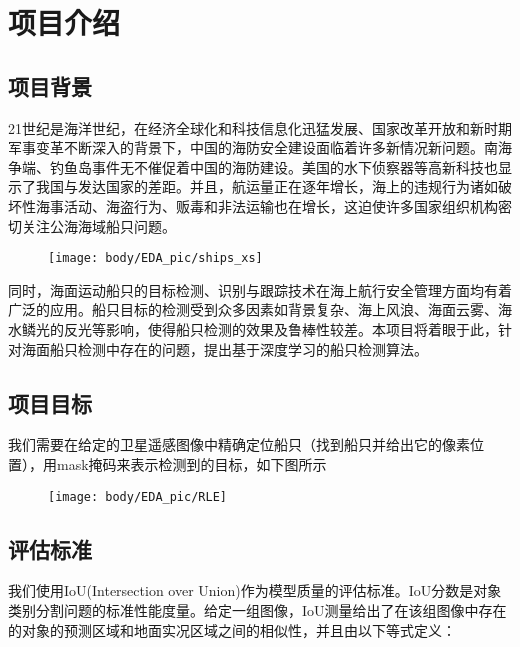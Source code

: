 
\chapter{项目介绍}\label{ux9879ux76eeux4ecbux7ecd}

\section{项目背景}\label{ux9879ux76eeux80ccux666f}

21世纪是海洋世纪，在经济全球化和科技信息化迅猛发展、国家改革开放和新时期军事变革不断深入的背景下，中国的海防安全建设面临着许多新情况新问题。南海争端、钓鱼岛事件无不催促着中国的海防建设。美国的水下侦察器等高新科技也显示了我国与发达国家的差距。并且，航运量正在逐年增长，海上的违规行为诸如破坏性海事活动、海盗行为、贩毒和非法运输也在增长，这迫使许多国家组织机构密切关注公海海域船只问题。

\begin{figure}[htbp]
\centering
\texttt{[image: body/EDA\_pic/ships\_xs]}
\caption{}
\end{figure}

同时，海面运动船只的目标检测、识别与跟踪技术在海上航行安全管理方面均有着广泛的应用。船只目标的检测受到众多因素如背景复杂、海上风浪、海面云雾、海水鳞光的反光等影响，使得船只检测的效果及鲁棒性较差。本项目将着眼于此，针对海面船只检测中存在的问题，提出基于深度学习的船只检测算法。

\section{项目目标}\label{ux9879ux76eeux76eeux6807}

我们需要在给定的卫星遥感图像中精确定位船只（找到船只并给出它的像素位置），用mask掩码来表示检测到的目标，如下图所示

\begin{figure}[htbp]
\centering
\texttt{[image: body/EDA\_pic/RLE]}
\caption{}
\end{figure}

\section{评估标准}\label{ux8bc4ux4f30ux6807ux51c6}

我们使用IoU(Intersection over
Union)作为模型质量的评估标准。IoU分数是对象类别分割问题的标准性能度量。给定一组图像，IoU测量给出了在该组图像中存在的对象的预测区域和地面实况区域之间的相似性，并且由以下等式定义：

